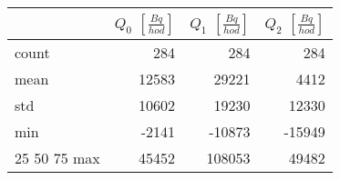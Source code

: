\begin{tabular}{lrrr}
\toprule
{} &  $Q_0$ $\left[\si{\frac{Bq}{hod}}\right]$ &  $Q_1$ $\left[\si{\frac{Bq}{hod}}\right]$ &  $Q_2$ $\left[\si{\frac{Bq}{hod}}\right]$ \\
\midrule
count &                                       284 &                                       284 &                                       284 \\
mean  &                                     12583 &                                     29221 &                                      4412 \\
std   &                                     10602 &                                     19230 &                                     12330 \\
min   &                                     -2141 &                                    -10873 &                                    -15949 \\
25%
50%
75%
max   &                                     45452 &                                    108053 &                                     49482 \\
\bottomrule
\end{tabular}
